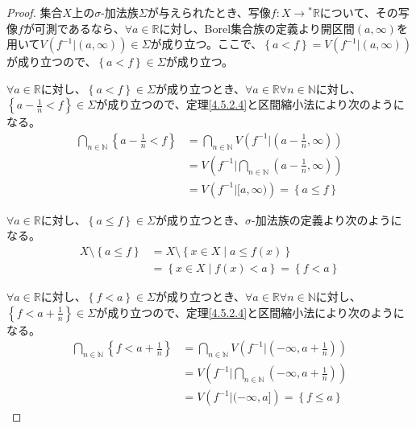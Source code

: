 \documentclass[dvipdfmx]{jsarticle}
\begin{document}
\begin{proof}
集合$X$上の$\sigma$-加法族$\varSigma$が与えられたとき、写像$f:X \rightarrow{}^{*}\mathbb{R}$について、その写像$f$が可測であるなら、$\forall a \in \mathbb{R}$に対し、Borel集合族の定義より開区間$(a,\infty)$を用いて$V\left( f^{- 1}|(a,\infty) \right) \in \varSigma$が成り立つ。ここで、$\left\{ a < f \right\} = V\left( f^{- 1}|(a,\infty) \right)$が成り立つので、$\left\{ a < f \right\} \in \varSigma$が成り立つ。\par
$\forall a \in \mathbb{R}$に対し、$\left\{ a < f \right\} \in \varSigma$が成り立つとき、$\forall a \in \mathbb{R}\forall n \in \mathbb{N}$に対し、$\left\{ a - \frac{1}{n} < f \right\} \in \varSigma$が成り立つので、定理\ref{4.5.2.4}と区間縮小法により次のようになる。
\begin{align*}
\bigcap_{n \in \mathbb{N}} \left\{ a - \frac{1}{n} < f \right\} &= \bigcap_{n \in \mathbb{N}} {V\left( f^{- 1}|\left( a - \frac{1}{n},\infty \right) \right)}\\
&= V\left( f^{- 1}|\bigcap_{n \in \mathbb{N}} \left( a - \frac{1}{n},\infty \right) \right)\\
&= V\left( f^{- 1}|[ a,\infty) \right) = \left\{ a \leq f \right\}
\end{align*}\par
$\forall a \in \mathbb{R}$に対し、$\left\{ a \leq f \right\} \in \varSigma$が成り立つとき、$\sigma$-加法族の定義より次のようになる。
\begin{align*}
X \setminus \left\{ a \leq f \right\} &= X \setminus \left\{ x \in X \middle| a \leq f(x) \right\}\\
&= \left\{ x \in X \middle| f(x) < a \right\} = \left\{ f < a \right\}
\end{align*}\par
$\forall a \in \mathbb{R}$に対し、$\left\{ f < a \right\} \in \varSigma$が成り立つとき、$\forall a \in \mathbb{R}\forall n \in \mathbb{N}$に対し、$\left\{ f < a + \frac{1}{n} \right\} \in \varSigma$が成り立つので、定理\ref{4.5.2.4}と区間縮小法により次のようになる。
\begin{align*}
\bigcap_{n \in \mathbb{N}} \left\{ f < a + \frac{1}{n} \right\} &= \bigcap_{n \in \mathbb{N}} {V\left( f^{- 1}|\left( - \infty,a + \frac{1}{n} \right) \right)}\\
&= V\left( f^{- 1}|\bigcap_{n \in \mathbb{N}} \left( - \infty,a + \frac{1}{n} \right) \right)\\
&= V\left( f^{- 1}|( - \infty,a] \right) = \left\{ f \leq a \right\}
\end{align*}\par

\end{proof}
\end{document}
